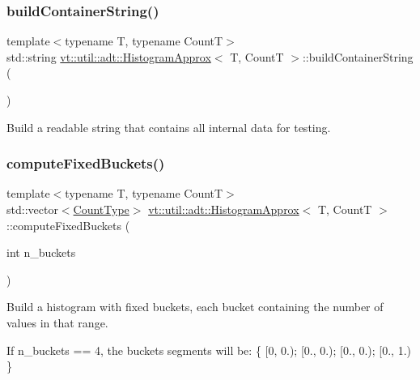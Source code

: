 \subsubsection{\texorpdfstring{build\+Container\+String()}{buildContainerString()}}
{\footnotesize\ttfamily template$<$typename T, typename CountT$>$ \\
std\+::string \hyperlink{structvt_1_1util_1_1adt_1_1_histogram_approx}{vt\+::util\+::adt\+::\+Histogram\+Approx}$<$ T, CountT $>$\+::build\+Container\+String (\begin{DoxyParamCaption}{ }\end{DoxyParamCaption})\hspace{0.3cm}{\ttfamily [inline]}}



Build a readable string that contains all internal data for testing. 

\mbox{\label{structvt_1_1util_1_1adt_1_1_histogram_approx_a740842719c1af07e00fcfaa4093dc193}} 
\subsubsection{\texorpdfstring{compute\+Fixed\+Buckets()}{computeFixedBuckets()}}
{\footnotesize\ttfamily template$<$typename T, typename CountT$>$ \\
std\+::vector$<$\hyperlink{structvt_1_1util_1_1adt_1_1_histogram_approx_aa2fb74665588d311da76dd821f2912c6}{Count\+Type}$>$ \hyperlink{structvt_1_1util_1_1adt_1_1_histogram_approx}{vt\+::util\+::adt\+::\+Histogram\+Approx}$<$ T, CountT $>$\+::compute\+Fixed\+Buckets (\begin{DoxyParamCaption}\item[{int}]{n\+\_\+buckets }\end{DoxyParamCaption})\hspace{0.3cm}{\ttfamily [inline]}}



Build a histogram with fixed buckets, each bucket containing the number of values in that range. 

If {\ttfamily n\+\_\+buckets} == 4, the buckets segments will be\+: \{ \mbox{[}0, 0.); \mbox{[}0., 0.); \mbox{[}0., 0.); \mbox{[}0., 1.) \}

